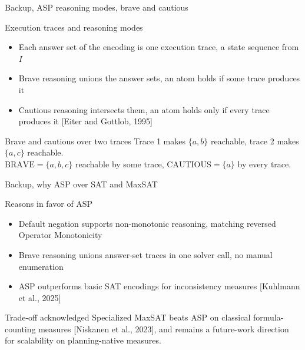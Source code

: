\begin{frame}[noframenumbering]{Backup, ASP reasoning modes, brave and cautious}
    \hypertarget{bk:asp-reasoning}{}
    \begin{block}{Execution traces and reasoning modes}
        \begin{itemize}
            \item Each answer set of the encoding is one execution trace, a state sequence from $I$
            \item Brave reasoning unions the answer sets, an atom holds if some trace produces it
            \item Cautious reasoning intersects them, an atom holds only if every trace produces it [Eiter and Gottlob, 1995]
        \end{itemize}
    \end{block}

    \begin{exampleblock}{Brave and cautious over two traces}
        Trace 1 makes $\{a, b\}$ reachable, trace 2 makes $\{a, c\}$ reachable. \\[2pt]
        $\text{BRAVE} = \{a, b, c\}$ reachable by some trace, \quad $\text{CAUTIOUS} = \{a\}$ by every trace.
    \end{exampleblock}

\end{frame}

\begin{frame}[noframenumbering]{Backup, why ASP over SAT and MaxSAT}
    \hypertarget{bk:asp-vs-sat}{}
    \begin{block}{Reasons in favor of ASP}
        \begin{itemize}
            \item Default negation supports non-monotonic reasoning, matching reversed Operator Monotonicity
            \item Brave reasoning unions answer-set traces in one solver call, no manual enumeration
            \item ASP outperforms basic SAT encodings for inconsistency measures [Kuhlmann et al., 2025]
        \end{itemize}
    \end{block}

    \begin{block}{Trade-off acknowledged}
        Specialized MaxSAT beats ASP on classical formula-counting measures [Niskanen et al., 2023], and remains a future-work direction for scalability on planning-native measures.
    \end{block}

\end{frame}

